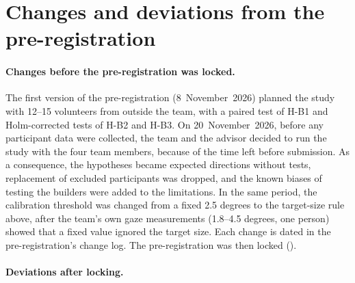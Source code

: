 \section{Changes and deviations from the pre-registration}
\label{sec:b-deviations}

\paragraph{Changes before the pre-registration was locked.}
The first version of the pre-registration (8~November~2026) planned the study with 12--15 volunteers
from outside the team, with a paired test of H-B1 and Holm-corrected tests of H-B2 and H-B3. On
20~November~2026, before any participant data were collected, the team and the advisor decided to run the
study with the four team members, because of the time left before submission. As a consequence, the
hypotheses became expected directions without tests, replacement of excluded participants was dropped,
and the known biases of testing the builders were added to the limitations. In the same period, the
calibration threshold was changed from a fixed 2.5 degrees to the target-size rule above, after the
team's own gaze measurements (1.8--4.5 degrees, one person) showed that a fixed value ignored the target
size. Each change is dated in the pre-registration's change log. The pre-registration was then locked
().

\paragraph{Deviations after locking.}
